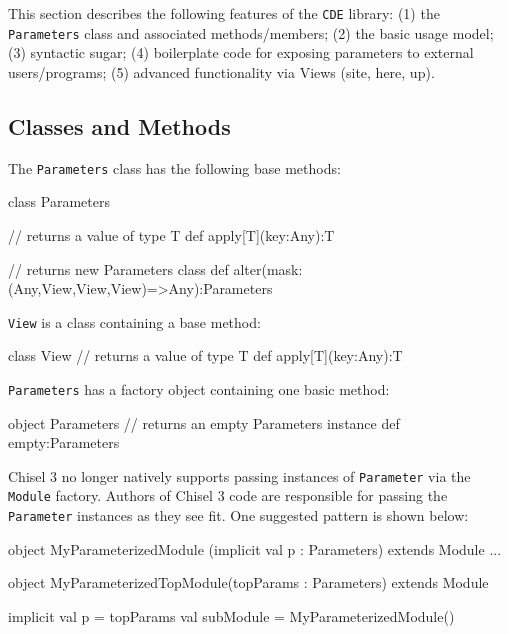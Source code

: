 \documentclass[10pt,twocolumn]{article}
\def\code#1{{\small\tt #1}}
\begin{document}
This section describes the following features of the \code{CDE} library:
(1) the \code{Parameters} class and associated methods/members;
(2) the basic usage model;
(3) syntactic sugar;
(4) boilerplate code for exposing parameters to external users/programs;
(5) advanced functionality via Views (site, here, up).

\subsection{Classes and Methods}
The \code{Parameters} class has the following base methods:

  \begin{scala}
class Parameters {
  // returns a value of type T
  def apply[T](key:Any):T 
  
  // returns new Parameters class
  def alter(mask:(Any,View,View,View)=>Any):Parameters 

}
  \end{scala}
\code{View} is a class containing a base method:
  \begin{scala}
class View {
  // returns a value of type T
  def apply[T](key:Any):T 
}
  \end{scala}
\code{Parameters} has a factory object containing one basic method:
  \begin{scala}
object Parameters {
  // returns an empty Parameters instance
  def empty:Parameters
}
  \end{scala}

%  

  Chisel 3 no longer natively supports passing instances of
  \code{Parameter} via the \code{Module} factory. Authors of Chisel 3
  code are responsible for passing the \code{Parameter} instances as
  they see fit. One suggested pattern is shown below:

  \begin{scala}

    object MyParameterizedModule (implicit val p : Parameters) extends
    Module {
      ...
    }
    
    object MyParameterizedTopModule(topParams : Parameters)
    extends Module {

      implicit val p = topParams
      val subModule = MyParameterizedModule()
      
    }

  \end{scala}
    
\end{document}
